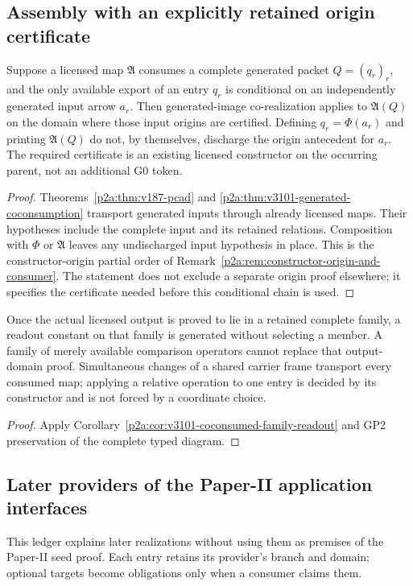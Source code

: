 \documentclass[12pt,a4paper]{article}
\begin{document}
\subsection{Assembly with an explicitly retained origin certificate}
\label{p2a:sec:v228-assembly-origin}
\begin{proposition}
\label{p2a:prop:v228-assembly-origin}
Suppose a licensed map $\mathfrak A$ consumes a complete generated packet
$Q=(q_r)_r$, and the only available export of an entry $q_r$ is conditional
on an independently generated input arrow $a_r$. Then generated-image
co-realization applies to $\mathfrak A(Q)$ on the domain where those input
origins are certified. Defining $q_r=\Phi(a_r)$ and printing
$\mathfrak A(Q)$ do not, by themselves, discharge the origin antecedent
for $a_r$. The required certificate is an existing licensed constructor
on the occurring parent, not an additional G0 token.
\end{proposition}
\begin{proof}
Theorems~\ref{p2a:thm:v187-pcad} and
\ref{p2a:thm:v3101-generated-coconsumption} transport generated inputs
through already licensed maps. Their hypotheses include the complete
input and its retained relations. Composition with $\Phi$ or
$\mathfrak A$ leaves any undischarged input hypothesis in place.
This is the constructor-origin partial order of
Remark~\ref{p2a:rem:constructor-origin-and-consumer}.
The statement does not exclude a separate origin proof elsewhere;
it specifies the certificate needed before this conditional chain is used.
\end{proof}
\begin{corollary}
\label{p2a:cor:v228-constant-source-fibre}
Once the actual licensed output is proved to lie in a retained complete
family, a readout constant on that family is generated without selecting
a member. A family of merely available comparison operators cannot replace
that output-domain proof. Simultaneous changes of a shared carrier frame
transport every consumed map; applying a relative operation to one entry
is decided by its constructor and is not forced by a coordinate choice.
\end{corollary}
\begin{proof}
Apply Corollary~\ref{p2a:cor:v3101-coconsumed-family-readout}
and GP2 preservation of the complete typed diagram.
\end{proof}


\subsection{Later providers of the Paper-II application interfaces}
\label{p2a:app:later-application-interfaces}
This ledger explains later realizations without using them as premises of
the Paper-II seed proof. Each entry retains its provider's branch and domain;
optional targets become obligations only when a consumer claims them.
\end{document}
